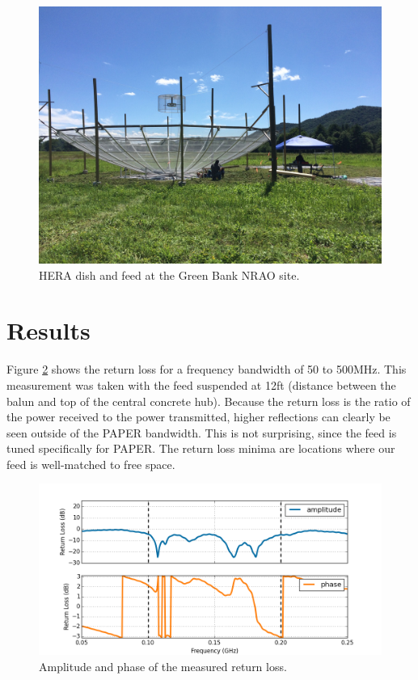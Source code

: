\documentclass[12pt,preprint]{aastex}
\begin{document}
\begin{figure}
\centering
\includegraphics[trim={2cm 20cm 30cm 15cm},clip, totalheight=0.45\textheight]{plots/heradish.jpg}
\caption{HERA dish and feed at the Green Bank NRAO site.}
\label{fig:heradish}
\end{figure}

\section{Results}

Figure \ref{fig:freq} shows the return loss for a frequency bandwidth of 50 to 500MHz. This measurement was taken with the feed suspended at 12ft (distance between the balun and top of the central concrete hub). Because the return loss is the ratio of the power received to the power transmitted, higher reflections can clearly be seen outside of the PAPER bandwidth. This is not surprising, since the feed is tuned specifically for PAPER. The return loss minima are locations where our feed is well-matched to free space.

\begin{figure}
\centering
\includegraphics[totalheight=0.4\textheight]{plots/frequency_amp_phase.png}
\caption{Amplitude and phase of the measured return loss.}
\label{fig:freq}
\end{figure}
\end{document}
